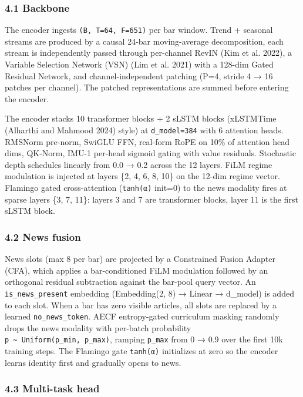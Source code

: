 \documentclass[
]{article}
\begin{document}
\subsubsection{4.1 Backbone}\label{backbone}

The encoder ingests \texttt{(B,\ T=64,\ F=651)} per bar window. Trend +
seasonal streams are produced by a causal 24-bar moving-average
decomposition, each stream is independently passed through per-channel
RevIN (Kim et al. 2022), a Variable Selection Network (VSN) (Lim et al.
2021) with a 128-dim Gated Residual Network, and channel-independent
patching (P=4, stride 4 → 16 patches per channel). The patched
representations are summed before entering the encoder.

The encoder stacks 10 transformer blocks + 2 sLSTM blocks (xLSTMTime
(Alharthi and Mahmood 2024) style) at \texttt{d\_model=384} with 6
attention heads. RMSNorm pre-norm, SwiGLU FFN, real-form RoPE on 10\% of
attention head dims, QK-Norm, IMU-1 per-head sigmoid gating with value
residuals. Stochastic depth schedules linearly from 0.0 → 0.2 across the
12 layers. FiLM regime modulation is injected at layers \{2, 4, 6, 8,
10\} on the 12-dim regime vector. Flamingo gated cross-attention
(\texttt{tanh(α)} init=0) to the news modality fires at sparse layers
\{3, 7, 11\}: layers 3 and 7 are transformer blocks, layer 11 is the
first sLSTM block.

\subsubsection{4.2 News fusion}\label{news-fusion}

News slots (max 8 per bar) are projected by a Constrained Fusion Adapter
(CFA), which applies a bar-conditioned FiLM modulation followed by an
orthogonal residual subtraction against the bar-pool query vector. An
\texttt{is\_news\_present} embedding (Embedding(2, 8) → Linear →
d\_model) is added to each slot. When a bar has zero visible articles,
all slots are replaced by a learned \texttt{no\_news\_token}. AECF
entropy-gated curriculum masking randomly drops the news modality with
per-batch probability
\texttt{p\ \textasciitilde{}\ Uniform(p\_min,\ p\_max)}, ramping
\texttt{p\_max} from 0 → 0.9 over the first 10k training steps. The
Flamingo gate \texttt{tanh(α)} initializes at zero so the encoder learns
identity first and gradually opens to news.

\subsubsection{4.3 Multi-task head}\label{multi-task-head}
\end{document}
